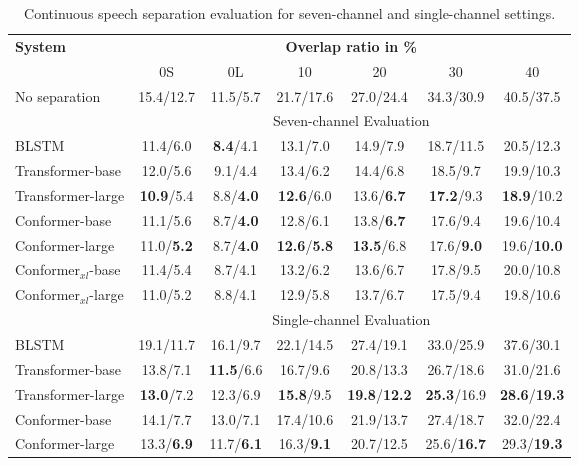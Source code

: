 \documentclass{article}
\begin{document}
	\begin{table*}[!t]
		\centering
		
		\caption{ Continuous speech separation evaluation for seven-channel and single-channel settings. }
		\label{tab:7ch_cont_result}
		
		\begin{tabular}{l|cccccc}
			\toprule \hline
			\multirow{2}{*}{\textbf{System}} &
			\multicolumn{6}{c}{\textbf{Overlap ratio in \%}} \\ &
			0S & 0L & 10 & 20 & 30 & 40   \\ 
			\hline
			No separation \cite{chen2020continuous} & 15.4/12.7 & 11.5/5.7 & 21.7/17.6 & 27.0/24.4 & 34.3/30.9 & 40.5/37.5 \\\hline
			&   \multicolumn{6}{c}{Seven-channel Evaluation} \\ 
			\hline
BLSTM & 11.4/6.0 & \textbf{8.4}/4.1 & 13.1/7.0 & 14.9/7.9 & 18.7/11.5 & 20.5/12.3 \\ 
Transformer-base & 12.0/5.6 & 9.1/4.4 & 13.4/6.2 & 14.4/6.8 & 18.5/9.7 & 19.9/10.3 \\					
			Transformer-large & \textbf{10.9}/5.4 & 8.8/\textbf{4.0} & \textbf{12.6}/6.0 & 13.6/\textbf{6.7} & \textbf{17.2}/9.3 & \textbf{18.9}/10.2 \\
			
			Conformer-base & 11.1/5.6 & 8.7/\textbf{4.0} & 12.8/6.1 & 13.8/\textbf{6.7} & 17.6/9.4 & 19.6/10.4 \\
			Conformer-large & 11.0/\textbf{5.2} & 8.7/\textbf{4.0} & \textbf{12.6}/\textbf{5.8} & \textbf{13.5}/6.8 & 17.6/\textbf{9.0} & 19.6/\textbf{10.0} \\ 
Conformer$_{xl}$-base & 11.4/5.4 & 8.7/4.1 & 13.2/6.2 & 13.6/6.7 & 17.8/9.5 & 20.0/10.8 \\
			Conformer$_{xl}$-large &  11.0/5.2 & 8.8/4.1 & 12.9/5.8 & 13.7/6.7 & 17.5/9.4 & 19.8/10.6\\ \hline
			&   \multicolumn{6}{c}{Single-channel Evaluation}  \\ \hline
			
			BLSTM &  19.1/11.7 & 16.1/9.7 & 22.1/14.5 & 27.4/19.1 & 33.0/25.9 & 37.6/30.1 \\
			
Transformer-base & 13.8/7.1 & \textbf{11.5}/6.6 & 16.7/9.6 & 20.8/13.3 & 26.7/18.6 & 31.0/21.6 \\
			Transformer-large & \textbf{13.0}/7.2 & 12.3/6.9 & \textbf{15.8}/9.5 & \textbf{19.8}/\textbf{12.2} & \textbf{25.3}/16.9 & \textbf{28.6}/\textbf{19.3} \\
			
			Conformer-base & 14.1/7.7 & 13.0/7.1 & 17.4/10.6 & 21.9/13.7 & 27.4/18.7 & 32.0/22.4 \\
			Conformer-large & 13.3/\textbf{6.9} & 11.7/\textbf{6.1} & 16.3/\textbf{9.1} & 20.7/12.5 & 25.6/\textbf{16.7} & 29.3/\textbf{19.3} \\ \hline
			
			\bottomrule
		\end{tabular}
\end{table*}
	
\end{document}
